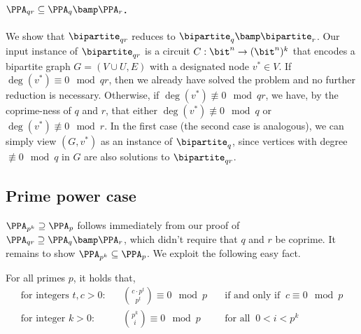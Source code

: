 \paragraph{\boldmath $\PPA_{qr} \subseteq \PPA_q \bamp\PPA_r$.}
We show that $\bipartite_{qr}$ reduces to $\bipartite_q \bamp\bipartite_r$. Our input instance of $\bipartite_{qr}$ is a circuit $C : \bit^n \to (\bit^n)^k$ that encodes a bipartite graph $G = (V\cup U, E)$ with a designated node $v^* \in V$. If $\deg(v^*) \equiv 0 \mod{qr}$, then we already have solved the problem and no further reduction is necessary. Otherwise, if $\deg(v^*) \not\equiv 0 \mod{qr}$, we have, by the coprime-ness of $q$ and $r$, that either $\deg(v^*) \not\equiv 0 \mod{q}$ or $\deg(v^*) \not\equiv 0 \mod{r}$. In the first case (the second case is analogous), we can simply view $(G,v^*)$ as an instance of $\bipartite_q$, since vertices with degree $\not\equiv 0 \mod{q}$ in $G$ are also solutions to $\bipartite_{qr}$.

\subsection{Prime power case} \label{sec:prime-power}

$\PPA_{p^k} \supseteq \PPA_{p}$ follows immediately from our proof of $\PPA_{qr} \supseteq \PPA_q \bamp\PPA_r$, which didn't require that $q$ and $r$ be coprime. It remains to show $\PPA_{p^k} \subseteq \PPA_{p}$. We exploit the following easy fact.

\begin{fact}\label{fact:primes}
For all primes $p$, it holds that,\vspace*{-1mm}
\begin{align}
\text{for integers } t, c > 0: && \binom{c \cdot p^{t}}{p^t} \equiv 0 \mod{p} &\quad \text{if and only if }\ c \equiv 0 \mod{p}\label{eq:lucas-1}\\
\text{for integer } k > 0: && \binom{p^k}{i} \equiv 0 \mod{p} &\quad \text{for all }\ 0 < i < p^k\label{eq:lucas-2}
\end{align}

\end{fact}

